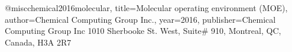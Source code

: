 @misc{chemical2016molecular,
  title={Molecular operating environment (MOE)},
  author={Chemical Computing Group Inc.},
  year={2016},
  publisher={Chemical Computing Group Inc 1010 Sherbooke St. West, Suite\# 910, Montreal, QC, Canada, H3A 2R7}
}
